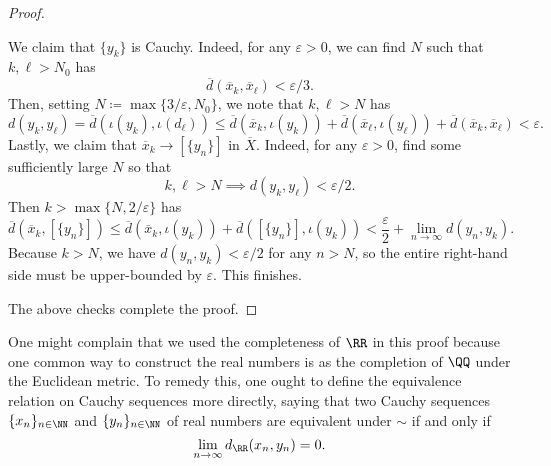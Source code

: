 \documentclass[../notes.tex]{subfiles}
\begin{document}
\begin{proof}
\begin{itemize}
		We claim that $\{y_k\}$ is Cauchy. Indeed, for any $\varepsilon>0$, we can find $N$ such that $k,\ell>N_0$ has
		\[\overline d(\overline x_k,\overline x_\ell)<\varepsilon/3.\]
		Then, setting $N\coloneqq\max\{3/\varepsilon,N_0\}$, we note that $k,\ell>N$ has
		\[d(y_k,y_\ell)=\overline d(\iota(y_k),\iota(d_\ell))\le\overline d(\overline x_k,\iota(y_k))+\overline d(\overline x_\ell,\iota(y_\ell))+\overline d(\overline x_k,\overline x_\ell)<\varepsilon.\]
		Lastly, we claim that $\overline x_k\to[\{y_n\}]$ in $\overline X$. Indeed, for any $\varepsilon>0$, find some sufficiently large $N$ so that
		\[k,\ell>N\implies d(y_k,y_\ell)<\varepsilon/2.\]
		Then $k>\max\{N,2/\varepsilon\}$ has
		\[\overline d(\overline x_k,[\{y_n\}])\le\overline d(\overline x_k,\iota(y_k))+\overline d([\{y_n\}],\iota(y_k))<\frac\varepsilon2+\lim_{n\to\infty}d(y_n,y_k).\]
		Because $k>N$, we have $d(y_n,y_k)<\varepsilon/2$ for any $n>N$, so the entire right-hand side must be upper-bounded by $\varepsilon$. This finishes.
	\end{itemize}
	The above checks complete the proof.
\end{proof}
\begin{remark}[Nir]
	One might complain that we used the completeness of $\RR$ in this proof because one common way to construct the real numbers is as the completion of $\QQ$ under the Euclidean metric. To remedy this, one ought to define the equivalence relation on Cauchy sequences more directly, saying that two Cauchy sequences $\{x_n\}_{n\in\NN}$ and $\{y_n\}_{n\in\NN}$ of real numbers are equivalent under $\sim$ if and only if
	\[\lim_{n\to\infty}d_\RR(x_n,y_n)=0.\]
\end{remark}
\end{document}
